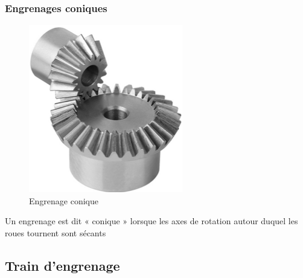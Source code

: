 \documentclass[10pt,fleqn]{article} %
\begin{document}
\subsubsection{Engrenages coniques}
  \begin{figure}[h]
    \centering
    \includegraphics[width=.3\textwidth]{images/engre_conique}
    \caption{Engrenage conique}
    \label{}
  \end{figure}

\begin{definition}
  Un engrenage est dit « conique » lorsque les axes de rotation autour duquel les roues tournent sont sécants
\end{definition}

\subsection{Train d'engrenage}
\begin{definition}
\end{definition}
\end{document}
